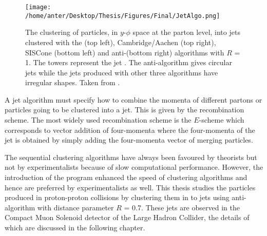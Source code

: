 \begin{figure}[!h]
\begin{center}
\hspace*{-20mm}
\texttt{[image: /home/anter/Desktop/Thesis/Figures/Final/JetAlgo.png]}\\
\vspace*{4mm}
\caption[The clustering of particles into jets using different jet algorithms.]{The clustering of particles, in $y$-$\phi$ space at the parton level, into jets clustered with the \kt (top left), Cambridge/Aachen (top right), SISCone (bottom left) and anti-\kt (bottom right) algorithms with $R$ = 1. The towers represent the jet \pt. The anti-\kt algorithm gives circular jets while the jets produced with other three algorithms have irregular shapes. Taken from \cite{Salam:2009jx}.}
\label{fig:jet_algo}
\end{center}
\end{figure}

A jet algorithm must specify how to combine the momenta of different partons or particles going to be clustered into a jet. This is given by the recombination scheme. The most widely used recombination scheme is the $E$-scheme \cite{Blazey:2000qt} which corresponds to vector addition of four-momenta where the four-momenta of the jet is obtained by simply adding the four-momenta vector of merging particles.
 
The sequential clustering algorithms have always been favoured by theorists but not by experimentalists because of slow computational performance. However, the introduction of the \fastjet program \cite{Cacciari:2011ma} enhanced the speed of clustering algorithms and hence are preferred by experimentalists as well. This thesis studies the particles produced in proton-proton collisions by clustering them in to jets using anti-\kt algorithm with distance parameter $R$ = 0.7. These jets are observed in the Compact Muon Solenoid detector of the Large Hadron Collider, the details of which are discussed in the following chapter.

